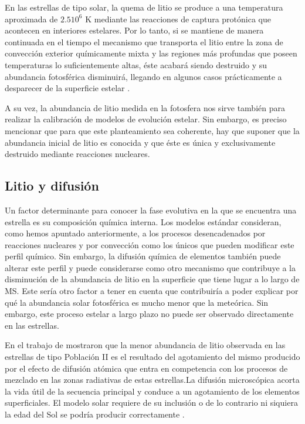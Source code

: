 En las estrellas de tipo solar, la quema de litio se produce a una temperatura aproximada de $2.5 10^{6}$ K mediante las reacciones de captura protónica que acontecen en interiores estelares. Por lo tanto, si se mantiene de manera continuada en el tiempo el mecanismo que transporta el litio entre la zona de convección exterior químicamente mixta y las regiones más profundas que poseen temperaturas lo suficientemente altas, éste acabará siendo destruido y su abundancia fotosférica disminuirá, llegando en algunos casos prácticamente a desparecer de la superficie estelar \citep{DelgadoMena2014}.\par

A su vez, la abundancia de litio medida en la fotosfera nos sirve también para realizar la calibración de modelos de evolución estelar. Sin embargo, es preciso mencionar que para que este planteamiento sea coherente, hay que suponer que la abundancia inicial de litio es conocida y que éste es única y exclusivamente destruido mediante reacciones nucleares.\par

\subsection{Litio y difusión}
Un factor determinante para conocer la fase evolutiva en la que se encuentra una estrella es su composición química interna. Los modelos estándar consideran, como hemos apuntado anteriormente, a los procesos desencadenados por reacciones nucleares y por convección como los únicos que pueden modificar este perfil químico. Sin embargo, la difusión química de elementos también puede alterar este perfil y puede considerarse como otro mecanismo que contribuye a la disminución de la abundancia de litio en la superficie que tiene lugar a lo largo de MS. Este sería otro factor a tener en cuenta que contribuiría a poder explicar por qué la abundancia solar fotosférica es mucho menor que la meteórica. Sin embargo, este proceso estelar a largo plazo no puede ser observado directamente en las estrellas.\par

En el trabajo de \cite{Richard2004} mostraron que la menor abundancia de litio observada en las estrellas de tipo Población II es el resultado del agotamiento del mismo producido por el efecto de difusión atómica que entra en competencia con los procesos de mezclado en las zonas radiativas de estas estrellas.La difusión microscópica acorta la vida útil de la secuencia principal y conduce a un agotamiento de los elementos superficiales. El modelo solar requiere de su inclusión o de lo contrario ni siquiera la edad del Sol se podría producir correctamente \citep{Thoul1993}.\par

